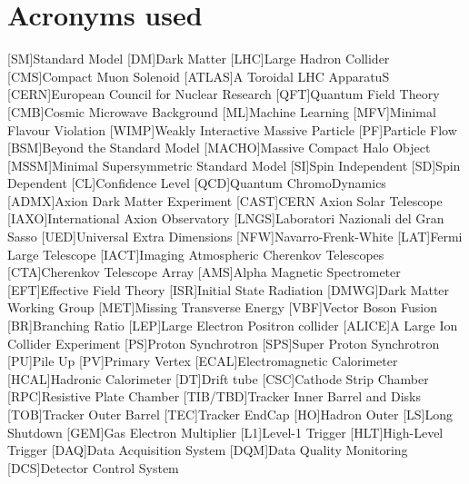 \documentclass[a4paper, 10pt, openright]{report}
\begin{document}
\chapter*{\huge{Acronyms used}}
\begin{multicols}{2}
\begin{acronym}

[SM]{Standard Model}
[DM]{Dark Matter}
[LHC]{Large Hadron Collider}
[CMS]{Compact Muon Solenoid}
[ATLAS]{A Toroidal LHC ApparatuS}
[CERN]{European Council for Nuclear Research}
[QFT]{Quantum Field Theory}
[CMB]{Cosmic Microwave Background}
[ML]{Machine Learning}
[MFV]{Minimal Flavour Violation}
[WIMP]{Weakly Interactive Massive Particle}
[PF]{Particle Flow}
[BSM]{Beyond the Standard Model}
[MACHO]{Massive Compact Halo Object}
[MSSM]{Minimal Supersymmetric Standard Model}
[SI]{Spin Independent}
[SD]{Spin Dependent}
[CL]{Confidence Level}
[QCD]{Quantum ChromoDynamics}
[ADMX]{Axion Dark Matter Experiment}
[CAST]{CERN Axion Solar Telescope}
[IAXO]{International Axion Observatory}
[LNGS]{Laboratori Nazionali del Gran Sasso}
[UED]{Universal Extra Dimensions}
[NFW]{Navarro-Frenk-White}
[LAT]{Fermi Large Telescope}
[IACT]{Imaging Atmospheric Cherenkov Telescopes}
[CTA]{Cherenkov Telescope Array}
[AMS]{Alpha Magnetic Spectrometer}
[EFT]{Effective Field Theory}
[ISR]{Initial State Radiation}
[DMWG]{Dark Matter Working Group}
[MET]{Missing Transverse Energy}
[VBF]{Vector Boson Fusion}
[BR]{Branching Ratio}
[LEP]{Large Electron Positron collider}
[ALICE]{A Large Ion Collider Experiment}
[PS]{Proton Synchrotron}
[SPS]{Super Proton Synchrotron}
[PU]{Pile Up}
[PV]{Primary Vertex}
[ECAL]{Electromagnetic Calorimeter}
[HCAL]{Hadronic Calorimeter}
[DT]{Drift tube}
[CSC]{Cathode Strip Chamber}
[RPC]{Resistive Plate Chamber}
[TIB/TBD]{Tracker Inner Barrel and Disks}
[TOB]{Tracker Outer Barrel}
[TEC]{Tracker EndCap} 
[HO]{Hadron Outer}
[LS]{Long Shutdown}
[GEM]{Gas Electron Multiplier}
[L1]{Level-1 Trigger}
[HLT]{High-Level Trigger}
[DAQ]{Data Acquisition System}
[DQM]{Data Quality Monitoring}
[DCS]{Detector Control System}

\end{acronym}
\end{multicols}
\newpage
\end{document}
